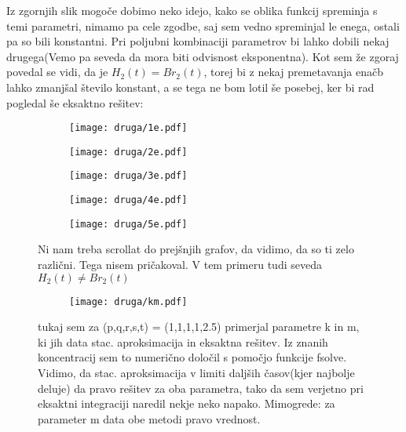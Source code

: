 \documentclass{article}
\begin{document}
Iz zgornjih slik mogoče dobimo neko idejo, kako se oblika funkcij spreminja s temi parametri, nimamo pa cele zgodbe, saj sem vedno spreminjal le enega, ostali pa so bili konstantni. Pri poljubni kombinaciji parametrov bi lahko dobili nekaj drugega(Vemo pa seveda da mora biti odvisnost eksponentna).
Kot sem že zgoraj povedal se vidi, da je $H_2(t) = Br_2(t)$, torej bi z nekaj premetavanja enačb lahko zmanjšal število konstant, a se tega ne bom lotil še posebej, ker bi rad pogledal še eksaktno rešitev:
\newpage
\begin{figure}[H]
\centering
\begin{subfigure}{.32\textwidth}
\texttt{[image: druga/1e.pdf]}
\end{subfigure}
\begin{subfigure}{.32\textwidth}
\texttt{[image: druga/2e.pdf]}
\end{subfigure}
\begin{subfigure}{.32\textwidth}
\texttt{[image: druga/3e.pdf]}
\end{subfigure}
\end{figure}
\begin{figure}[H]
\centering
\begin{subfigure}{.49\textwidth}
\texttt{[image: druga/4e.pdf]}
\end{subfigure}
\begin{subfigure}{.49\textwidth}
\texttt{[image: druga/5e.pdf]}
\end{subfigure}
\caption*{Ni nam treba scrollat do prejšnjih grafov, da vidimo, da so ti zelo različni. Tega nisem pričakoval. V tem primeru tudi seveda $H_2(t) \neq Br_2(t)$}
\end{figure}

\begin{figure}[H]
\centering
\begin{subfigure}{\textwidth}
\texttt{[image: druga/km.pdf]}
\end{subfigure}
\caption*{tukaj sem za (p,q,r,s,t) = (1,1,1,1,2.5) primerjal parametre k in m, ki jih data stac. aproksimacija in eksaktna rešitev. Iz znanih koncentracij sem to numerično določil s pomočjo funkcije fsolve. Vidimo, da stac. aproksimacija v limiti daljših časov(kjer najbolje deluje) da pravo rešitev za oba parametra, tako da sem verjetno pri eksaktni integraciji naredil nekje neko napako. Mimogrede: za parameter m data obe metodi pravo vrednost.}
\end{figure}
\end{document}
